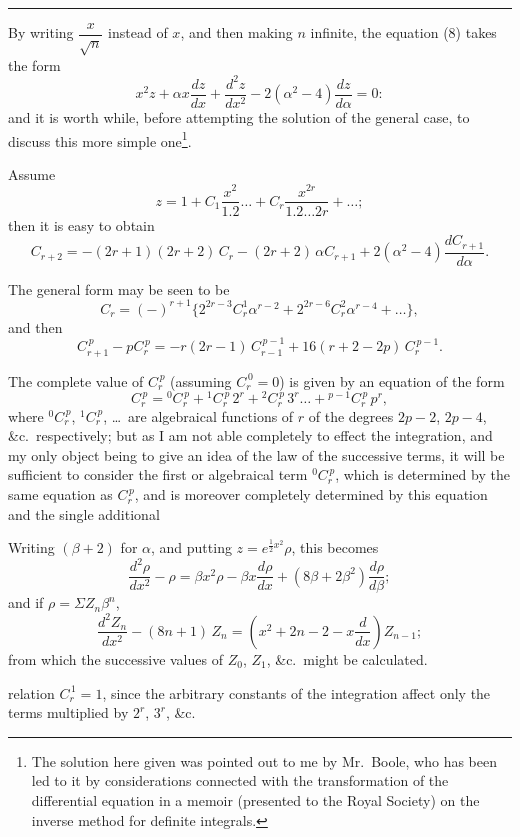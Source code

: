 \documentclass[11pt,a4paper]{book}
\begin{document}
\bigskip
\hrule
\bigskip

By writing $\dfrac{x}{\sqrt{n}}$ instead of $x$, and then making $n$ infinite, the equation (8) takes the form
\[
x^2 z + \alpha x \frac{dz}{dx} + \frac{d^2 z}{dx^2} - 2(\alpha^2 - 4)\frac{dz}{d\alpha} = 0 \tag{9}:
\]
and it is worth while, before attempting the solution of the general case, to discuss this more simple one\footnote{The solution here given was pointed out to me by Mr.~Boole, who has been led to it by considerations connected with the transformation of the differential equation in a memoir (presented to the Royal Society) on the inverse method for definite integrals.}.

Assume
\[
z = 1 + C_1 \frac{x^2}{1.2} \ldots + C_r \frac{x^{2r}}{1.2 \ldots 2r} + \ldots;
\]
then it is easy to obtain
\[
C_{r+2} = -(2r+1)(2r+2)\,C_r - (2r+2)\,\alpha C_{r+1} + 2(\alpha^2 - 4)\frac{dC_{r+1}}{d\alpha}.
\]

The general form may be seen to be
\[
C_r = (-)^{r+1} \{2^{2r-3} C_r^1 \alpha^{r-2} + 2^{2r-6} C_r^2 \alpha^{r-4} + \ldots\},
\]
and then
\[
C_{r+1}^{\,p} - p C_r^{\,p} = -r(2r-1)\, C_{r-1}^{\,p-1} + 16(r+2-2p)\, C_r^{\,p-1}.
\]

The complete value of $C_r^{\,p}$ (assuming $C_r^{\,0} = 0$) is given by an equation of the form
\[
C_r^{\,p} = {}^0 C_r^{\,p} + {}^1 C_r^{\,p}\, 2^r + {}^2 C_r^{\,p}\, 3^r \ldots + {}^{p-1} C_r^{\,p}\, p^r,
\]
where ${}^0 C_r^{\,p}$, ${}^1 C_r^{\,p}$, \ldots\ are algebraical functions of $r$ of the degrees $2p-2$, $2p-4$, \&c.\ respectively; but as I am not able completely to effect the integration, and my only object being to give an idea of the law of the successive terms, it will be sufficient to consider the first or algebraical term ${}^0 C_r^{\,p}$, which is determined by the same equation as $C_r^{\,p}$, and is moreover completely determined by this equation and the single additional

Writing $(\beta + 2)$ for $\alpha$, and putting $z = e^{\frac{1}{2}x^2} \rho$, this becomes
\[
\frac{d^2 \rho}{dx^2} - \rho = \beta x^2 \rho - \beta x \frac{d\rho}{dx} + (8\beta + 2\beta^2) \frac{d\rho}{d\beta};
\]
and if $\rho = \Sigma Z_n \beta^n$,
\[
\frac{d^2 Z_n}{dx^2} - (8n+1)\,Z_n = \left(x^2 + 2n - 2 - x \frac{d}{dx}\right) Z_{n-1};
\]
from which the successive values of $Z_0$, $Z_1$, \&c.\ might be calculated.


relation $C_r^{\,1} = 1$, since the arbitrary constants of the integration affect only the terms multiplied by $2^r$, $3^r$, \&c.
\end{document}
